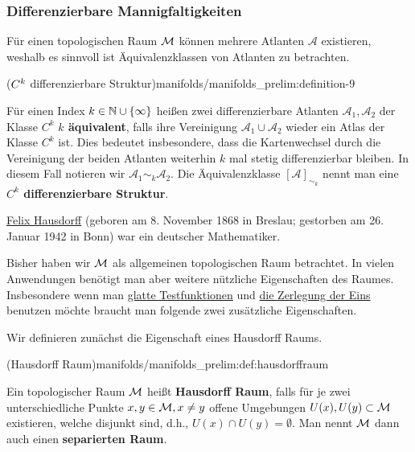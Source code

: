 \subsubsection{Differenzierbare Mannigfaltigkeiten}
\label{\detokenize{manifolds/manifolds_prelim:differenzierbare-mannigfaltigkeiten}}
\par
Für einen topologischen Raum \(\mathcal{M}\) können mehrere Atlanten \(\mathcal{A}\) existieren, weshalb es sinnvoll ist Äquivalenzklassen von Atlanten zu betrachten.
\begin{definition}{(\protect\(C^k\protect\) differenzierbare Struktur)}{manifolds/manifolds_prelim:definition-9}



\par
Für einen Index \(k\in \mathbb{N} \cup \{\infty\}\) heißen zwei differenzierbare Atlanten \(\mathcal{A}_1, \mathcal{A}_2\) der Klasse \(C^k\) \textbf{\(k\) äquivalent}, falls ihre Vereinigung \(\mathcal{A}_1\cup \mathcal{A}_2\) wieder ein Atlas der Klasse \(C^k\) ist.
Dies bedeutet insbesondere, dass die Kartenwechsel durch die Vereinigung der beiden Atlanten weiterhin \(k\) mal stetig differenzierbar bleiben.
In diesem Fall notieren wir \(\mathcal{A}_1\sim_k \mathcal{A}_2\).
Die Äquivalenzklasse \([\mathcal{A}]_{\sim_k}\) nennt man eine \textbf{\(C^k\) differenzierbare Struktur}.
\end{definition}

\begin{emphBox}{}{}

\par
\href{https://de.wikipedia.org/wiki/Felix\_Hausdorff}{Felix Hausdorff} (geboren am 8. November 1868 in Breslau; gestorben am 26. Januar 1942 in Bonn) war ein deutscher Mathematiker.
\end{emphBox}

\par
Bisher haben wir \(\mathcal{M}\) als allgemeinen topologischen Raum betrachtet.
In vielen Anwendungen benötigt man aber weitere nützliche Eigenschaften des Raumes.
Insbesondere wenn man \href{https://de.wikipedia.org/wiki/Testfunktion}{glatte Testfunktionen} und \href{https://en.wikipedia.org/wiki/Partition\_of\_unity}{die Zerlegung der Eins} benutzen möchte braucht man folgende zwei zusätzliche Eigenschaften.

\par
Wir definieren zunächst die Eigenschaft eines Hausdorff Raums.
\begin{definition}{(Hausdorff Raum)}{manifolds/manifolds_prelim:def:hausdorffraum}



\par
Ein topologischer Raum \(\mathcal{M}\) heißt \textbf{Hausdorff Raum}, falls für je zwei unterschiedliche Punkte \(x,y\in \mathcal{M}, x\neq y\) offene Umgebungen \(U(x), U(y) \subset \mathcal{M}\) existieren, welche disjunkt sind, d.h., \(U(x)\cap U(y) = \emptyset\).
Man nennt \(\mathcal{M}\) dann auch einen \textbf{separierten Raum}.
\end{definition}


